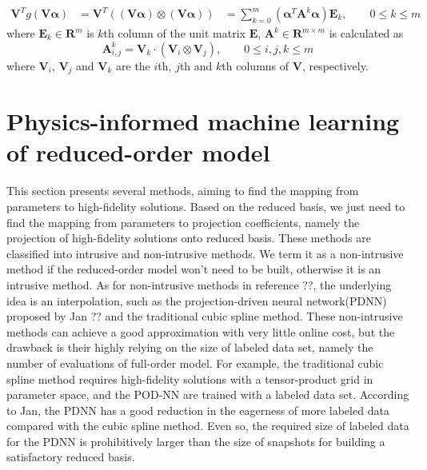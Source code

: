 \documentclass[preprint, 10pt]{elsarticle}
\begin{document}
\begin{equation}
\begin{aligned}
\mathbf{V}^T
g \left( \mathbf{V} \pmb{\alpha} \right)
&=
\mathbf{V}^T
\left(
\left( \mathbf{V} \pmb{\alpha} \right) \otimes \left( \mathbf{V} \pmb{\alpha} \right)
\right)
&= \sum_{k=0}^{m} { \left( \pmb{\alpha}^T \mathbf{A}^k \pmb{\alpha} \right) \mathbf{E}_k }, \qquad 0 \le k \le m
\end{aligned}
\label{eq_ReductionNonlinear}
\end{equation}
where $\mathbf{E}_k \in \mathbf{R}^{m}$ is $k$th column of the unit matrix $\mathbf{E}$, $\mathbf{A}^k \in \mathbf{R}^{m \times m}$ is calculated as
\begin{equation}
\mathbf{A}_{i,j}^k = \mathbf{V}_k \cdot \left( \mathbf{V}_i \otimes \mathbf{V}_j \right), \qquad 0 \le i,j,k \le m
\end{equation}
where $\mathbf{V}_i$, $\mathbf{V}_j$ and $\mathbf{V}_k$ are the $i$th, $j$th and $k$th columns of $\mathbf{V}$, respectively.

\section{Physics-informed machine learning of reduced-order model}
This section presents several methods, aiming to find the mapping from parameters to high-fidelity solutions. Based on the reduced basis, we just need to find the mapping from parameters to projection coefficients, namely the projection of high-fidelity solutions onto reduced basis.
These methods are classified into intrusive and non-intrusive methods. We term it as a non-intrusive method if the reduced-order model won't need to be built, otherwise it is an intrusive method.
As for non-intrusive methods in reference ??, the underlying idea is an interpolation, such as the projection-driven neural network(PDNN) proposed by Jan ?? and the traditional cubic spline method. These non-intrusive methods can achieve a good approximation with very little online cost, but the drawback is their highly relying on the size of labeled data set, namely the number of evaluations of full-order model.
For example, the traditional cubic spline method requires high-fidelity solutions with a tensor-product grid in parameter space, and the POD-NN are trained with a labeled data set.
According to Jan, the PDNN has a good reduction in the eagerness of more labeled data compared with the cubic spline method.
Even so, the required size of labeled data for the PDNN is prohibitively larger than the size of snapshots for building a satisfactory reduced basis.
\end{document}
